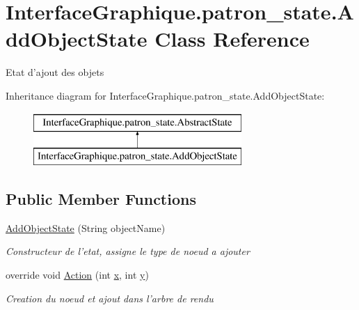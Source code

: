 \hypertarget{class_interface_graphique_1_1patron__state_1_1_add_object_state}{\section{Interface\-Graphique.\-patron\-\_\-state.\-Add\-Object\-State Class Reference}
\label{class_interface_graphique_1_1patron__state_1_1_add_object_state}
}


Etat d'ajout des objets  


Inheritance diagram for Interface\-Graphique.\-patron\-\_\-state.\-Add\-Object\-State\-:\begin{figure}[H]
\begin{center}
\leavevmode
\includegraphics[height=2.000000cm]{class_interface_graphique_1_1patron__state_1_1_add_object_state}
\end{center}
\end{figure}
\subsection*{Public Member Functions}
\begin{DoxyCompactItemize}
\item 
\hyperlink{class_interface_graphique_1_1patron__state_1_1_add_object_state_ad94cfea968dac4748bbd8161583bf71b}{Add\-Object\-State} (String object\-Name)
\begin{DoxyCompactList}\small\item\em Constructeur de l'etat, assigne le type de noeud a ajouter \end{DoxyCompactList}\item 
override void \hyperlink{class_interface_graphique_1_1patron__state_1_1_add_object_state_a5f251f4a42b766f424c3e31af3d181b3}{Action} (int \hyperlink{group__inf2990_ga6150e0515f7202e2fb518f7206ed97dc}{x}, int \hyperlink{group__inf2990_ga0a2f84ed7838f07779ae24c5a9086d33}{y})
\begin{DoxyCompactList}\small\item\em Creation du noeud et ajout dans l'arbre de rendu \end{DoxyCompactList}\end{DoxyCompactItemize}


